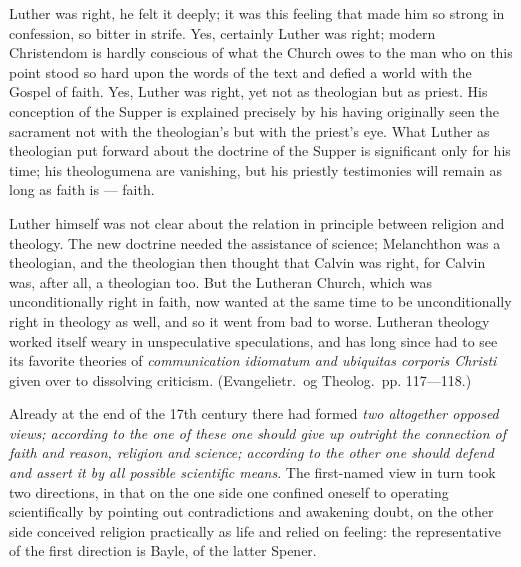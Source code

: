 \documentclass[12pt]{book}
\newcommand{\opage}[1]{\marginnote{\footnotesize\textit{[#1]}}}
\begin{document}
Luther was right, he felt it deeply; it was this feeling that made him so
strong in confession, so bitter in strife. Yes, certainly Luther was right;
modern Christendom is hardly conscious of what the Church owes to the man who
on this point stood so hard upon the words of the text and defied a world with
the Gospel of faith. Yes, Luther was right, yet not as theologian but as
priest. His conception of the Supper is explained precisely by his having
originally seen the sacrament not with the theologian's but with the priest's
eye. What Luther as theologian put forward about the doctrine of the Supper is
significant only for his time; his theologumena
\opage{267}\setcounter{footnote}{0}%
are vanishing, but his priestly testimonies will remain as long as faith is
--- faith.

Luther himself was not clear about the relation in principle between religion
and theology. The new doctrine needed the assistance of science; Melanchthon
was a theologian, and the theologian then thought that Calvin was right, for
Calvin was, after all, a theologian too. But the Lutheran Church, which was
unconditionally right in faith, now wanted at the same time to be
unconditionally right in theology as well, and so it went from bad to worse.
Lutheran theology worked itself weary in unspeculative speculations, and has
long since had to see its favorite theories of \textit{communication
idiomatum and ubiquitas corporis Christi} given
over to dissolving criticism. (Evangelietr.\ og Theolog.\ pp. 117---118.)

Already at the end of the 17th century there had formed \textit{two
altogether opposed views; according to the one of these one should give up
outright the connection of faith and reason, religion and science; according
to the other one should defend and assert it by all possible scientific
means}. The first-named view in turn took two directions, in that on the one
side one confined oneself to operating scientifically by pointing out
contradictions and awakening doubt, on the other side conceived religion
practically as life and relied on feeling: the representative of the first
direction is Bayle, of the latter Spener.
\end{document}

